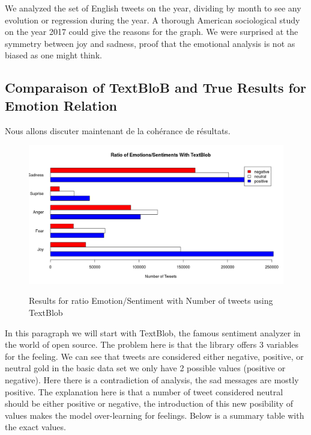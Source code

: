 \documentclass{acmtog} %
\begin{document}
\begin{itemize}
We analyzed the set of English tweets on the year, dividing by month to see any evolution or regression during the year. A thorough American sociological study on the year 2017 could give the reasons for the graph. We were surprised at the symmetry between joy and sadness, proof that the emotional analysis is not as biased as one might think. 

\subsection{Comparaison of TextBloB and True Results for Emotion Relation}
\label{subsub:comparaisonEmotionRelation}

Nous allons discuter maintenant de la cohérance de résultats.

\begin{figure}[h!]
{\includegraphics[width=\linewidth]{ratio-textblob.png}}
\caption{Results for ratio Emotion/Sentiment with Number of tweets using TextBlob}
  \label{fig:contradiction_barplot}
\end{figure}


In this paragraph we will start with TextBlob, the famous sentiment analyzer in the world of open source. The problem here is that the library offers 3 variables for the feeling. We can see that tweets are considered either negative, positive, or neutral gold in the basic data set we only have 2 possible values ​​(positive or negative). Here there is a contradiction of analysis, the sad messages are mostly positive. The explanation here is that a number of tweet considered neutral should be either positive or negative, the introduction of this new posibility of values ​​makes the model over-learning for feelings. Below is a summary table with the exact values.

\begin{table}[H]
\label{tab:cross_tab_TextBLOB}
\end{table}



\end{itemize}
\end{document}
